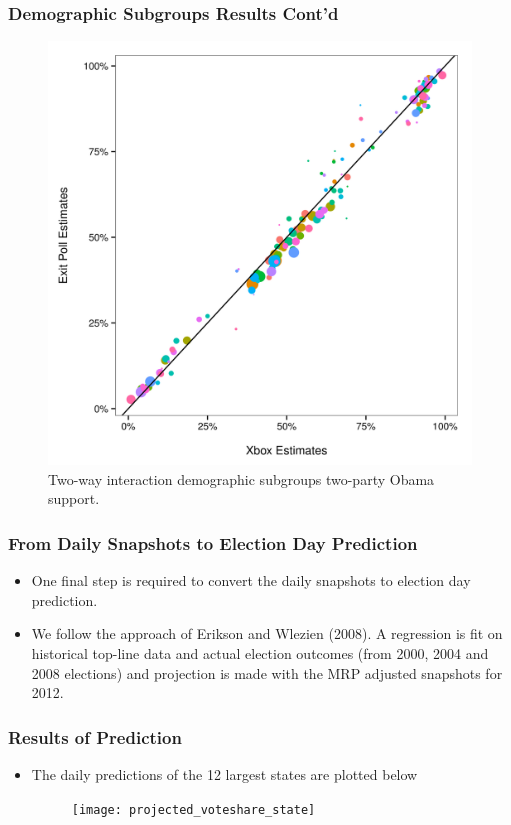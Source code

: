 \documentclass[xetex,mathserif,serif]{beamer}
\begin{document}
\begin{frame}
  \frametitle{Demographic Subgroups Results Cont'd}
  \begin{figure}[htbp]
    \centering
    \includegraphics[width=.6\textwidth]{"demo_groups_two_way_interaction"}
    \caption{Two-way interaction demographic subgroups two-party Obama support.}
  \end{figure}
\end{frame}

\begin{frame}
  \frametitle{From Daily Snapshots to Election Day Prediction}
  \begin{itemize}
  \item One final step is required to convert the daily snapshots to election day
    prediction.
  \item We follow the approach of Erikson and Wlezien (2008). A regression is fit
    on historical top-line data and actual election outcomes (from 2000, 2004 and
    2008 elections) and projection is made with the MRP adjusted snapshots for
    2012.
  \end{itemize}
\end{frame}


\begin{frame}
  \frametitle{Results of Prediction}
  \begin{itemize}
  \item The daily predictions of the 12 largest states are plotted below
    \begin{figure}[htbp]
      \centering
      \texttt{[image: projected\_voteshare\_state]}
    \end{figure}
  \end{itemize}
\end{frame}
\end{document}
